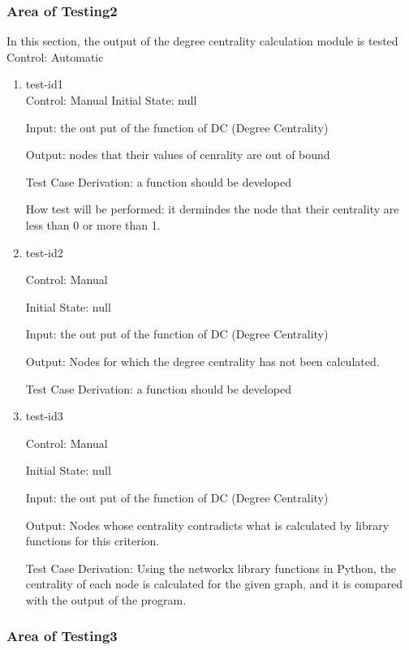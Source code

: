\documentclass[12pt, titlepage]{article}
\begin{document}
\subsubsection{Area of Testing2}

In this section, the output of the degree centrality calculation module is tested
Control: Automatic

\begin{enumerate}

\item{test-id1\\}	
Control: Manual				
Initial State: null
					
Input: the out put of the function of DC (Degree Centrality)
					
Output: nodes that their values of cenrality are out of bound

Test Case Derivation: a function should be developed 

How test will be performed: it dermindes the node that their centrality are less than 0 or more than 1.
\item{test-id2\\}

Control: Manual
					
Initial State: null
					
Input: the out put of the function of DC (Degree Centrality)
					
Output: Nodes for which the degree centrality has not been calculated.

Test Case Derivation: a function should be developed 

\item{test-id3\\}

Control: Manual
					
Initial State: null
					
Input: the out put of the function of DC (Degree Centrality)
					
Output: Nodes whose centrality contradicts what is calculated by library functions for this criterion.

Test Case Derivation: Using the networkx library functions in Python, the centrality of each node is calculated for the given graph, and it is compared with the output of the program.


\end{enumerate}
\subsubsection{Area of Testing3}
\end{document}
